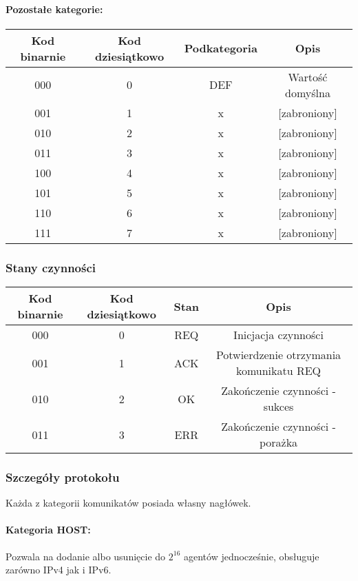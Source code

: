 \documentclass[10pt,a4paper]{article}
\begin{document}
				\paragraph{Pozostałe kategorie:\\}
				
				\begin{tabular}{ c | c | c | c }
				    \textbf{Kod binarnie} & \textbf{Kod dziesiątkowo} & \textbf{Podkategoria} & \textbf{Opis} \\
				    \hline
				    000 & 0 & DEF & Wartość domyślna \\
				    001 & 1 & x & [zabroniony] \\
				    010 & 2 & x & [zabroniony] \\
				    011 & 3 & x & [zabroniony] \\
				    100 & 4 & x & [zabroniony] \\
				    101 & 5 & x & [zabroniony] \\
				    110 & 6 & x & [zabroniony] \\
				    111 & 7 & x & [zabroniony] \\
				\end{tabular}
		        
	        \subsubsection{Stany czynności}
		        \begin{tabular}{ c | c | c | c }
				    \textbf{Kod binarnie} & \textbf{Kod dziesiątkowo} & \textbf{Stan} & \textbf{Opis} \\
				    \hline
				    000 & 0 & REQ & Inicjacja czynności \\
				    001 & 1 & ACK & Potwierdzenie otrzymania komunikatu REQ \\
				    010 & 2 & OK & Zakończenie czynności - sukces \\
				    011 & 3 & ERR & Zakończenie czynności - porażka \\
				\end{tabular}
				
        \subsubsection{Szczegóły protokołu}
            Każda z kategorii komunikatów posiada własny nagłówek.\\
            
            \paragraph{Kategoria HOST:\\}
            Pozwala na dodanie albo usunięcie do $2^{16}$ agentów jednocześnie, obsługuje zarówno IPv4 jak i IPv6.
            
\end{document}
